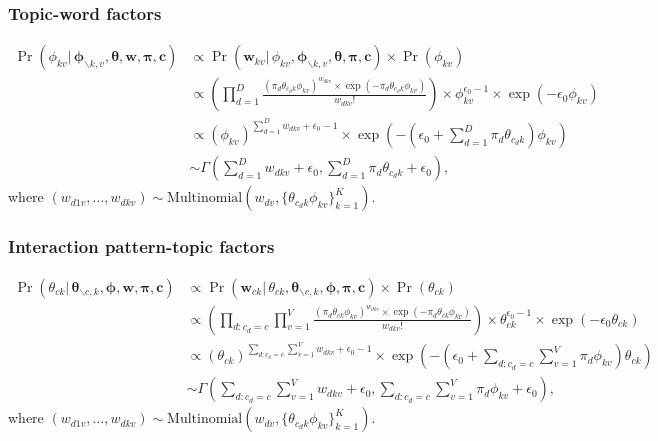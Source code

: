 \documentclass[ba]{imsart}
\numberwithin{equation}{section}
\theoremstyle{plain}
\begin{document}
				\subsubsection{Topic-word factors}
				\begin{equation}
				\begin{aligned}
				\Pr(\phi_{kv}|\,\boldsymbol{\phi}_{\backslash k,v},\boldsymbol{\theta},\boldsymbol{w},\boldsymbol{\pi},\boldsymbol{c}) & \propto \Pr(\boldsymbol{w}_{kv}|\,\phi_{kv},\boldsymbol{\phi}_{\backslash k,v},\boldsymbol{\theta},\boldsymbol{\pi},\boldsymbol{c}) \times \Pr(\phi_{kv})\\
				& \propto (\prod_{d=1}^D \frac{(\pi_{d} \theta_{c_dk}\phi_{kv})^{w_{dkv}}\times \exp(-\pi_{d} \theta_{c_dk}\phi_{kv})}{w_{dkv}!} )\times \phi_{kv}^{\epsilon_0-1} \times \exp(-\epsilon_0 \phi_{kv})\\
				&\propto (\phi_{kv})^{\sum_{d=1}^D w_{dkv}+\epsilon_0-1}\times \exp(-(\epsilon_0 +\sum_{d=1}^D\pi_{d} \theta_{c_dk})\phi_{kv})\\
				&	\sim \Gamma(\sum_{d=1}^D w_{dkv}+\epsilon_0, \sum_{d=1}^D\pi_{d} \theta_{c_dk}+\epsilon_0),
				\end{aligned}	
				\end{equation}
				where $(w_{d1v},\ldots,w_{dkv}) \sim \mbox{Multinomial}(w_{dv}, \{ \theta_{c_dk}\phi_{kv}\}_{k=1}^K)$.
	\subsubsection{Interaction pattern-topic factors}
				\begin{equation}
				\begin{aligned}
				\Pr(\theta_{ck}|\,\boldsymbol{\theta}_{\backslash c,k},\boldsymbol{\phi},\boldsymbol{w},\boldsymbol{\pi},\boldsymbol{c}) & \propto \Pr(\boldsymbol{w}_{ck}|\,\theta_{ck},\boldsymbol{\theta}_{\backslash c,k},\boldsymbol{\phi},\boldsymbol{\pi},\boldsymbol{c}) \times \Pr(\theta_{ck})\\
				& \propto (\prod_{d:c_d=c}\prod_{v=1}^V \frac{(\pi_{d} \theta_{ck}\phi_{kv})^{w_{dkv}}\times \exp(-\pi_{d} \theta_{ck}\phi_{kv})}{w_{dkv}!} )\times \theta_{ck}^{\epsilon_0-1} \times \exp(-\epsilon_0 \theta_{ck})\\
				&\propto (\theta_{ck})^{\sum_{d:c_d=c}\sum_{v=1}^V w_{dkv}+\epsilon_0-1}\times \exp(-(\epsilon_0 +\sum_{d:c_d=c}\sum_{v=1}^V\pi_{d} \phi_{kv})\theta_{ck})\\
				&	\sim \Gamma(\sum_{d:c_d=c}\sum_{v=1}^V w_{dkv}+\epsilon_0, \sum_{d:c_d=c}\sum_{v=1}^V\pi_{d} \phi_{kv}+\epsilon_0),
				\end{aligned}	
				\end{equation}
				where $(w_{d1v},\ldots,w_{dkv}) \sim \mbox{Multinomial}(w_{dv}, \{ \theta_{c_dk}\phi_{kv}\}_{k=1}^K)$.					
\end{document}
